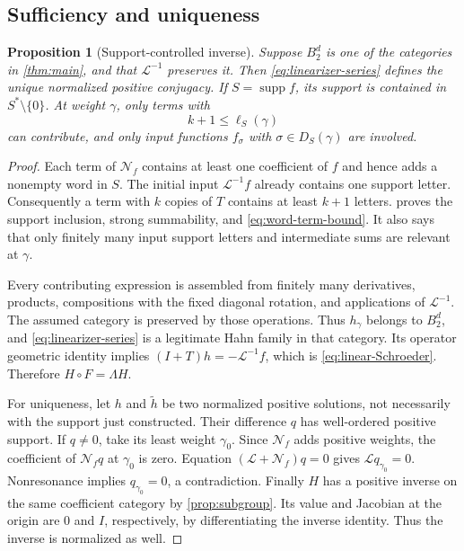 \documentclass[11pt,letterpaper]{article}
\newtheorem{proposition}[proposition]{Proposition}
\theoremstyle{definition}
\theoremstyle{remark}
\newcommand{\supp}{\operatorname{supp}}
\newcommand{\Li}{\mathcal L}
\newcommand{\NN}{\mathcal N}
\numberwithin{equation}{section}
\begin{document}
\subsection{Sufficiency and uniqueness}
\begin{proposition}[Support-controlled inverse]\label{prop:linearization}
Suppose $B_2^d$ is one of the categories in \cref{thm:main}, and that
$\Li^{-1}$ preserves it. Then \eqref{eq:linearizer-series} defines the unique
normalized positive conjugacy. If $S=\supp f$, its support is contained in
$S^*\setminus\{0\}$. At weight $\gamma$, only terms with
\begin{equation}\label{eq:word-term-bound}
 k+1\le\ell_S(\gamma)
\end{equation}
can contribute, and only input functions $f_\sigma$ with
$\sigma\in D_S(\gamma)$ are involved.
\end{proposition}
\begin{proof}
Each term of $\NN_f$ contains at least one coefficient of $f$ and hence
adds a nonempty word in $S$. The initial input $\Li^{-1}f$ already
contains one support letter. Consequently a term with $k$ copies of $T$
contains at least $k+1$ letters.  proves the support
inclusion, strong summability, and \eqref{eq:word-term-bound}. It also says
that only finitely many input support letters and intermediate sums are
relevant at $\gamma$.

Every contributing expression is assembled from finitely many derivatives,
products, compositions with the fixed diagonal rotation, and applications
of $\Li^{-1}$. The assumed category is preserved by those operations. Thus
$h_\gamma$ belongs to $B_2^d$, and \eqref{eq:linearizer-series} is a
legitimate Hahn family in that category. Its operator geometric identity
implies
$(I+T)h=-\Li^{-1}f$, which is \eqref{eq:linear-Schroeder}. Therefore
$H\circ F=\Lambda H$.

For uniqueness, let $h$ and $\widetilde h$ be two normalized positive
solutions, not necessarily with the support just constructed. Their
difference $q$ has well-ordered positive support. If $q\ne0$, take its least
weight $\gamma_0$. Since $\NN_f$ adds positive weights, the coefficient of
$\NN_f q$ at $\gamma_0$ is zero. Equation
$(\Li+\NN_f)q=0$ gives $\Li q_{\gamma_0}=0$. Nonresonance implies
$q_{\gamma_0}=0$, a contradiction. Finally $H$ has a positive inverse on
the same coefficient category by \cref{prop:subgroup}. Its value and
Jacobian at the origin are $0$ and $I$, respectively, by differentiating
the inverse identity. Thus the inverse is normalized as well.
\end{proof}
\end{document}
